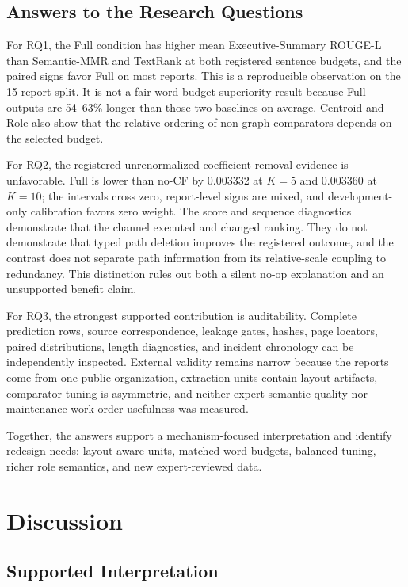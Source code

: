 \documentclass[applsci,article,submit,moreauthors]{Definitions/mdpi}
\begin{document}
\subsection{Answers to the Research Questions}

For RQ1, the Full condition has higher mean Executive-Summary ROUGE-L than Semantic-MMR and TextRank at both registered sentence budgets, and the paired signs favor Full on most reports. This is a reproducible observation on the 15-report split. It is not a fair word-budget superiority result because Full outputs are 54--63\% longer than those two baselines on average. Centroid and Role also show that the relative ordering of non-graph comparators depends on the selected budget.

For RQ2, the registered unrenormalized coefficient-removal evidence is unfavorable. Full is lower than no-CF by 0.003332 at $K=5$ and 0.003360 at $K=10$; the intervals cross zero, report-level signs are mixed, and development-only calibration favors zero weight. The score and sequence diagnostics demonstrate that the channel executed and changed ranking. They do not demonstrate that typed path deletion improves the registered outcome, and the contrast does not separate path information from its relative-scale coupling to redundancy. This distinction rules out both a silent no-op explanation and an unsupported benefit claim.

For RQ3, the strongest supported contribution is auditability. Complete prediction rows, source correspondence, leakage gates, hashes, page locators, paired distributions, length diagnostics, and incident chronology can be independently inspected. External validity remains narrow because the reports come from one public organization, extraction units contain layout artifacts, comparator tuning is asymmetric, and neither expert semantic quality nor maintenance-work-order usefulness was measured.

Together, the answers support a mechanism-focused interpretation and identify redesign needs: layout-aware units, matched word budgets, balanced tuning, richer role semantics, and new expert-reviewed data.

\section{Discussion}

\subsection{Supported Interpretation}
\end{document}
